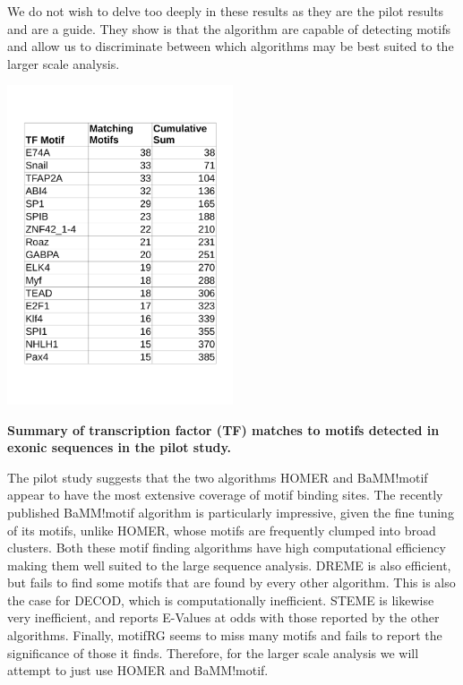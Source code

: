 \documentclass[12pt, onecolumn, oneside]{gsajnl}
\begin{document}
We do not wish to delve too deeply in these results as they are the pilot results and are a guide. They show is that the algorithm are capable of detecting
motifs and allow us to discriminate between which algorithms may be best suited to the larger scale analysis.

\begin{table}[!h]
    \centering
     \includegraphics[width= 0.5\textwidth]{plots/table4_study.pdf} 
    \caption{{\bf Summary of transcription factor (TF) matches to motifs detected in exonic sequences in the pilot study.}}
    \label{fig: motif_tf_summary_exons}
\end{table}


The pilot study suggests that the two algorithms HOMER and BaMM!motif appear to have the most extensive coverage of motif binding sites. The recently published BaMM!motif algorithm is particularly impressive, given the fine tuning of its motifs, unlike HOMER, whose motifs are frequently clumped into broad clusters. Both these motif finding algorithms have high computational efficiency making them well suited to the large sequence analysis. DREME is also 
efficient, but fails to find some motifs that are found by every other algorithm. This is also the case for DECOD, which is computationally inefficient. STEME is
likewise very inefficient, and reports E-Values at odds with those reported by the other algorithms. Finally, motifRG seems to miss many motifs and fails to report the significance of those it finds. Therefore, for the larger scale analysis we will attempt to just use HOMER and BaMM!motif.
\end{document}
